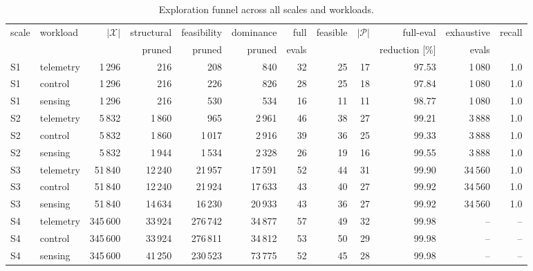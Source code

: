 \documentclass[pdflatex,sn-nature]{sn-jnl}
\theoremstyle{thmstyleone}
\theoremstyle{thmstyletwo}
\theoremstyle{thmstylethree}
\begin{document}
\begin{table}[!htbp]\centering
\caption{Exploration funnel across all scales and workloads.}\label{tabS11}
{\let\scriptsize\tiny\setlength{\tabcolsep}{2pt}\scriptsize
\setlength{\tabcolsep}{3.5pt}
\begin{tabular}{llrrrrrrrrrr}
\toprule
scale & workload & $|\mathcal{X}|$ & structural & feasibility & dominance & full & feasible & $|\mathcal{P}|$ & full-eval & exhaustive & recall \\
 & & & pruned & pruned & pruned & evals & & & reduction [\%] & evals & \\
\midrule
S1 & telemetry & 1\,296 & 216 & 208 & 840 & 32 & 25 & 17 & 97.53 & 1\,080 & 1.0 \\
S1 & control & 1\,296 & 216 & 226 & 826 & 28 & 25 & 18 & 97.84 & 1\,080 & 1.0 \\
S1 & sensing & 1\,296 & 216 & 530 & 534 & 16 & 11 & 11 & 98.77 & 1\,080 & 1.0 \\
S2 & telemetry & 5\,832 & 1\,860 & 965 & 2\,961 & 46 & 38 & 27 & 99.21 & 3\,888 & 1.0 \\
S2 & control & 5\,832 & 1\,860 & 1\,017 & 2\,916 & 39 & 36 & 25 & 99.33 & 3\,888 & 1.0 \\
S2 & sensing & 5\,832 & 1\,944 & 1\,534 & 2\,328 & 26 & 19 & 16 & 99.55 & 3\,888 & 1.0 \\
S3 & telemetry & 51\,840 & 12\,240 & 21\,957 & 17\,591 & 52 & 44 & 31 & 99.90 & 34\,560 & 1.0 \\
S3 & control & 51\,840 & 12\,240 & 21\,924 & 17\,633 & 43 & 40 & 27 & 99.92 & 34\,560 & 1.0 \\
S3 & sensing & 51\,840 & 14\,634 & 16\,230 & 20\,933 & 43 & 36 & 27 & 99.92 & 34\,560 & 1.0 \\
S4 & telemetry & 345\,600 & 33\,924 & 276\,742 & 34\,877 & 57 & 49 & 32 & 99.98 & -- & -- \\
S4 & control & 345\,600 & 33\,924 & 276\,811 & 34\,812 & 53 & 50 & 29 & 99.98 & -- & -- \\
S4 & sensing & 345\,600 & 41\,250 & 230\,523 & 73\,775 & 52 & 45 & 28 & 99.98 & -- & -- \\
\bottomrule
\end{tabular}}
\end{table}
\end{document}
